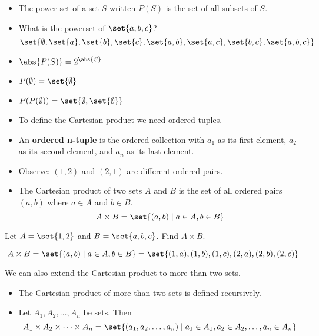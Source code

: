 \documentclass[8pt]{scrreprt}
\begin{document}
\begin{landscape}
\begin{multicols*}{3}
\begin{definition}
	\begin{itemize}
		\item The power set of a set $S$ written $P(S)$ is the set of all subsets of $S$.
		\item What is the powerset of $\set{a, b, c}$?
		      \[
			      \set{\emptyset, \set{a}, \set{b}, \set{c}, \set{a,b}, \set{a,c}, \set{b,c}, \set{a,b,c}}
		      \]
		\item $\abs{P(S)}=2^{\abs{S}}$
		\item $P(\emptyset)=\set{\emptyset}$
		\item $P(P(\emptyset)) = \set{\emptyset, \set{\emptyset}}$
	\end{itemize}
\end{definition}

\begin{definition}
	\begin{itemize}
		\item To define the Cartesian product we need ordered tuples.
		\item An \textbf{ordered n-tuple} is the ordered collection with $a_1$
		      as its first element, $a_2$ as its second element, and $a_n$ as its last element.
		\item Observe: $(1, 2)$ and $(2, 1)$ are different ordered pairs.
		\item The Cartesian product of two sets $A$ and $B$ is the set of all ordered pairs $(a,b)$ where $a\in A$ and $b\in B$.
		      \[
			      A\times B = \set{(a,b)\mid a\in A, b\in B}
		      \]
	\end{itemize}
\end{definition}

\begin{example}
	Let $A=\set{1,2}$ and $B=\set{a,b,c}$. Find $A\times B$.

	\[
		A\times B = \set{(a,b)\mid a\in A, b\in B} = \set{(1,a), (1,b), (1,c), (2,a), (2,b), (2,c)}
	\]

\end{example}

We can also extend the Cartesian product to more than two sets.

\begin{definition}
	\begin{itemize}
		\item The Cartesian product of more than two sets is defined recursively.
		\item Let $A_1, A_2, \ldots, A_n$ be sets. Then
		      \[
			      A_1\times A_2\times \cdots \times A_n = \set{(a_1, a_2, \ldots, a_n)\mid a_1\in A_1, a_2\in A_2, \ldots, a_n\in A_n}
		      \]
	\end{itemize}
\end{definition}


\end{multicols*}
\end{landscape}
\end{document}
